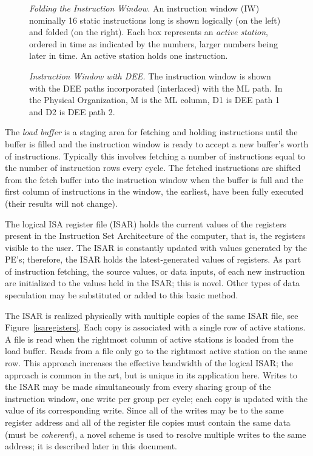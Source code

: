 \documentclass[10pt,dvips]{article}
\begin{document}
\begin{figure}
\centering
{}
\caption{{\em Folding the Instruction Window.} An instruction window (IW) nominally 16
static instructions long is shown logically (on the left) and folded (on the right).
Each box represents an {\it active station}, ordered in time as indicated by the numbers,
larger numbers being later in time. An active station holds one instruction.}
\label{foldediwindow}
\end{figure}

\begin{figure}
\centering
{}
\caption{{\em Instruction Window with DEE.} The instruction window is shown with
the DEE paths incorporated (interlaced) with the ML path. In the Physical Organization,
M is the ML column, D1 is DEE path 1 and D2 is DEE path 2.}
\label{deeiwindow}
\end{figure}


The {\it load
buffer} is a staging area for fetching and holding instructions until the buffer is
filled and the instruction window is ready to accept a new buffer's worth of
instructions. Typically this involves
fetching a number of instructions equal to the number of instruction rows every
cycle. The fetched instructions are shifted from the fetch buffer into the
instruction window when the buffer is full and the first column of instructions in the
window, the earliest, have been fully executed (their results will not change).

The logical
ISA register file (ISAR) holds the current values of the registers present in the
Instruction Set Architecture of the computer, that is, the registers visible to
the user. The ISAR is constantly updated with values generated by the PE's; therefore,
the ISAR holds the latest-generated values of registers.
As part of instruction fetching, the source values, or data inputs,
of each new instruction are initialized to the values held in the ISAR; this is novel.
Other types
of data speculation may be substituted or added to this basic method.

The ISAR is realized physically with multiple copies of the same ISAR file, see
Figure~\ref{isaregisters}. Each copy is associated with a single row of active
stations. A file is read when the rightmost column of active stations is
loaded from the load buffer. Reads from a file only go to the rightmost active
station on the same row. This approach increases the effective bandwidth
of the logical ISAR; the approach is common in the art, but is unique in its
application here. Writes to the ISAR may be made simultaneously from every
sharing group of the instruction window, one write per group per cycle;
each copy is updated with the value of its
corresponding
write. Since all of the writes may be to the same register address and all of the
register file copies must contain the same data (must be {\it coherent}), a
novel scheme is used to resolve multiple writes to the same address; it is
described later in this document.
\end{document}
